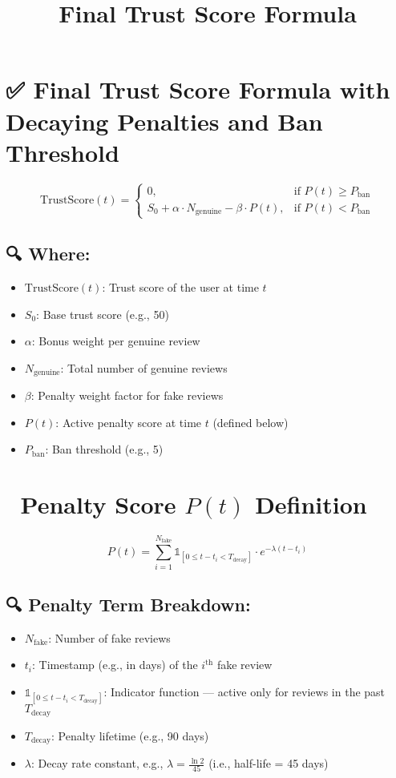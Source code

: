 \documentclass{article}
\title{Final Trust Score Formula}
\date{}
\begin{document}
\maketitle

\section*{✅ Final Trust Score Formula with Decaying Penalties and Ban Threshold}

\[
\text{TrustScore}(t) = 
\begin{cases}
0, & \text{if } P(t) \geq P_{\text{ban}} \\
S_0 + \alpha \cdot N_{\text{genuine}} - \beta \cdot P(t), & \text{if } P(t) < P_{\text{ban}}
\end{cases}
\]

\subsection*{🔍 Where:}

\begin{itemize}
    \item $\text{TrustScore}(t)$: Trust score of the user at time $t$
    \item $S_0$: Base trust score (e.g., 50)
    \item $\alpha$: Bonus weight per genuine review
    \item $N_{\text{genuine}}$: Total number of genuine reviews
    \item $\beta$: Penalty weight factor for fake reviews
    \item $P(t)$: Active penalty score at time $t$ (defined below)
    \item $P_{\text{ban}}$: Ban threshold (e.g., 5)
\end{itemize}

\section*{🔻 Penalty Score $P(t)$ Definition}

\[
P(t) = \sum_{i=1}^{N_{\text{fake}}} \mathbb{1}_{[0 \leq t - t_i < T_{\text{decay}}]} \cdot e^{-\lambda (t - t_i)}
\]

\subsection*{🔍 Penalty Term Breakdown:}

\begin{itemize}
    \item $N_{\text{fake}}$: Number of fake reviews
    \item $t_i$: Timestamp (e.g., in days) of the $i^{\text{th}}$ fake review
    \item $\mathbb{1}_{[0 \leq t - t_i < T_{\text{decay}}]}$: Indicator function — active only for reviews in the past $T_{\text{decay}}$
    \item $T_{\text{decay}}$: Penalty lifetime (e.g., 90 days)
    \item $\lambda$: Decay rate constant, e.g., $\lambda = \frac{\ln 2}{45}$ \quad (i.e., half-life = 45 days)
\end{itemize}
\end{document}
